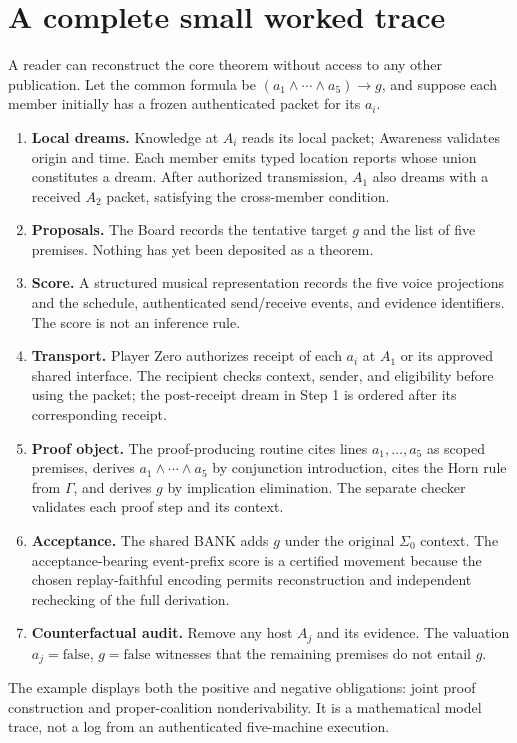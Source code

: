 \documentclass[11pt,letterpaper]{article}
\theoremstyle{definition}
\theoremstyle{remark}
\begin{document}
\section{A complete small worked trace}
A reader can reconstruct the core theorem without access to any other publication. Let the common formula be $(a_1\land\cdots\land a_5)\to g$, and suppose each member initially has a frozen authenticated packet for its $a_i$.
\begin{enumerate}[label=\textbf{Step \arabic*.},leftmargin=*]
\item \textbf{Local dreams.} Knowledge at $A_i$ reads its local packet; Awareness validates origin and time. Each member emits typed location reports whose union constitutes a dream. After authorized transmission, $A_1$ also dreams with a received $A_2$ packet, satisfying the cross-member condition.
\item \textbf{Proposals.} The Board records the tentative target $g$ and the list of five premises. Nothing has yet been deposited as a theorem.
\item \textbf{Score.} A structured musical representation records the five voice projections and the schedule, authenticated send/receive events, and evidence identifiers. The score is not an inference rule.
\item \textbf{Transport.} Player Zero authorizes receipt of each $a_i$ at $A_1$ or its approved shared interface. The recipient checks context, sender, and eligibility before using the packet; the post-receipt dream in Step 1 is ordered after its corresponding receipt.
\item \textbf{Proof object.} The proof-producing routine cites lines $a_1,\ldots,a_5$ as scoped premises, derives $a_1\land\cdots\land a_5$ by conjunction introduction, cites the Horn rule from $\Gamma$, and derives $g$ by implication elimination. The separate checker validates each proof step and its context.
\item \textbf{Acceptance.} The shared BANK adds $g$ under the original $\Sigma_0$ context. The acceptance-bearing event-prefix score is a certified movement because the chosen replay-faithful encoding permits reconstruction and independent rechecking of the full derivation.
\item \textbf{Counterfactual audit.} Remove any host $A_j$ and its evidence. The valuation $a_j=\mathrm{false}$, $g=\mathrm{false}$ witnesses that the remaining premises do not entail $g$.
\end{enumerate}
The example displays both the positive and negative obligations: joint proof construction and proper-coalition nonderivability. It is a mathematical model trace, not a log from an authenticated five-machine execution.
\end{document}
